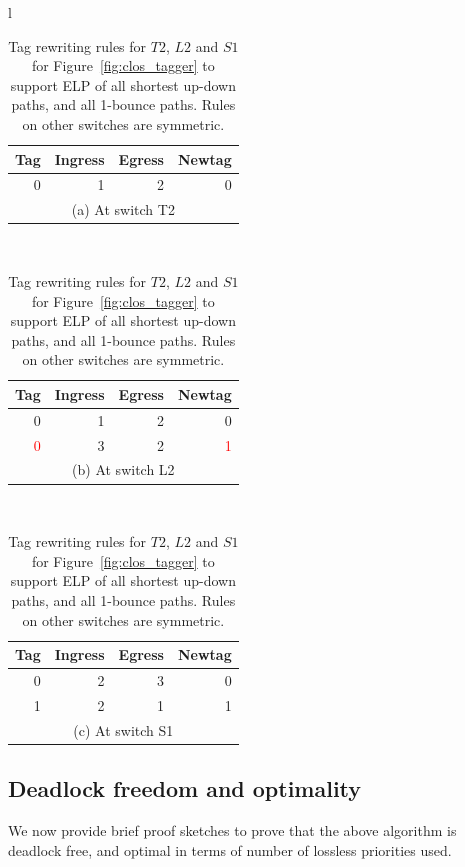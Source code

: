 \begin{table}[t]
		\centering
		\footnotesize
		\begin{tabular}{l}
		\begin{tabular}{|r|r|r|r|}
			\hline
			Tag&  Ingress& Egress & Newtag \\
			\hline
			\hline
			0 & 1 & 2 & 0 \\
			\hline
			\multicolumn{4}{c}{(a) At switch T2} \\
		\end{tabular}
		\\
		\begin{tabular}{|r|r|r|r|}
			\hline
			Tag&  Ingress& Egress & Newtag \\
			\hline
			\hline
			0 & 1 & 2 & 0 \\
			\hline
			\textcolor{red}{0} & 3 & 2 & \textcolor{red}{1} \\
			\hline
			\multicolumn{4}{c}{(b) At switch L2} \\
		\end{tabular}
		\\
		
		\begin{tabular}{|r|r|r|r|}
			\hline
			Tag&  Ingress& Egress & Newtag \\
			\hline
			\hline
			0 & 2 & 3 & 0 \\
				\hline
			1 & 2 & 1 & 1 \\
			\hline
			\multicolumn{4}{c}{(c) At switch S1} \\
		\end{tabular}
		
	\end{tabular}
		\caption{Tag rewriting rules for $T2$, $L2$ and $S1$ for Figure~\ref{fig:clos_tagger} to support
		ELP of all shortest up-down paths, and all 1-bounce paths. Rules on other
		switches are symmetric.}
		\label{tab:clos_tag_rules}
		\vspace{-1em}
\end{table}

\subsection {Deadlock freedom and optimality}
\label{subsec:specific_deadlock_free}

We now provide brief proof sketches to prove that the above algorithm is
deadlock free, and optimal in terms of number of lossless priorities used.


